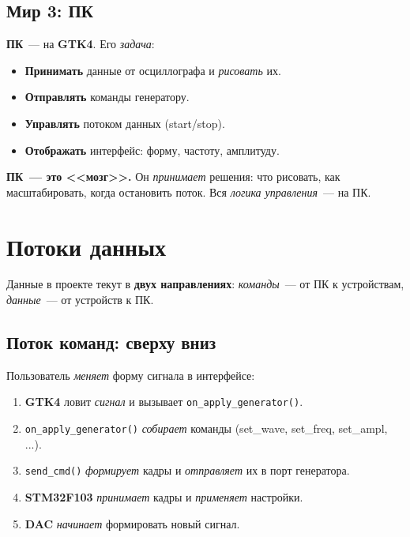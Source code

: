 \subsection{Мир 3: ПК}

\textbf{ПК}~--- на \textbf{GTK4}. Его \emph{задача}:

\begin{itemize}
    \item \textbf{Принимать} данные от осциллографа
          и \emph{рисовать} их.
    \item \textbf{Отправлять} команды генератору.
    \item \textbf{Управлять} потоком данных (start/stop).
    \item \textbf{Отображать} интерфейс: форму, частоту,
          амплитуду.
\end{itemize}

\begin{keybox}
\textbf{ПК~--- это <<мозг>>.} Он \emph{принимает} решения:
что рисовать, как масштабировать, когда остановить поток.
Вся \emph{логика управления}~--- на ПК.
\end{keybox}

\section{Потоки данных}
\label{sec:arch-data-flow}

Данные в проекте текут в \textbf{двух направлениях}:
\emph{команды}~--- от ПК к устройствам, \emph{данные}~---
от устройств к ПК.

\subsection{Поток команд: сверху вниз}

Пользователь \emph{меняет} форму сигнала в интерфейсе:

\begin{enumerate}
    \item \textbf{GTK4} ловит \emph{сигнал} и вызывает
          \texttt{on\_apply\_generator()}.
    \item \texttt{on\_apply\_generator()} \emph{собирает}
          команды (set\_wave, set\_freq, set\_ampl, ...).
    \item \texttt{send\_cmd()} \emph{формирует} кадры
          и \emph{отправляет} их в порт генератора.
    \item \textbf{STM32F103} \emph{принимает} кадры
          и \emph{применяет} настройки.
    \item \textbf{DAC} \emph{начинает} формировать
          новый сигнал.
\end{enumerate}

